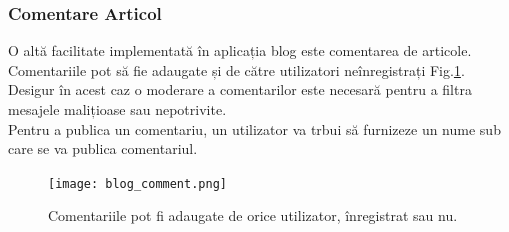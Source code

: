 \documentclass[11pt]{scrartcl} %
\begin{document}
\subsubsection{Comentare Articol}

O altă facilitate implementată în aplicația blog este comentarea de articole. Comentariile pot să fie adaugate și de către utilizatori neînregistrați Fig.\ref{fig:blog_comment}. Desigur în acest caz o moderare a comentarilor este necesară pentru a filtra mesajele malițioase sau nepotrivite.\\
Pentru a publica un comentariu, un utilizator va trbui să furnizeze un nume sub care se va publica comentariul.

\begin{figure}[h] %
	\centering
	\texttt{[image: blog\_comment.png]} %
	\caption{Comentariile pot fi adaugate de orice utilizator, înregistrat sau nu. }
	\label{fig:blog_comment}
\end{figure}

\end{document}
